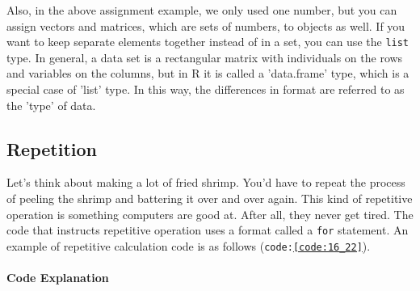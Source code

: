 \documentclass{ltjsbook}
\begin{document}
Also, in the above assignment example, we only used one number, but you can assign vectors and matrices, which are sets of numbers, to objects as well. If you want to keep separate elements together instead of in a set, you can use the \verb|list| type.
In general, a data set is a rectangular matrix with individuals on the rows and variables on the columns, but in R it is called a 'data.frame' type, which is a special case of 'list' type. In this way, the differences in format are referred to as the 'type' of data.





\subsection{Repetition}
Let's think about making a lot of fried shrimp. You'd have to repeat the process of peeling the shrimp and battering it over and over again. This kind of repetitive operation is something computers are good at. After all, they never get tired.
The code that instructs repetitive operation uses a format called a \texttt{for} statement. An example of repetitive calculation code is as follows (\texttt{code:\ref{code:16_22}}).



\paragraph{Code Explanation}

\end{document}
